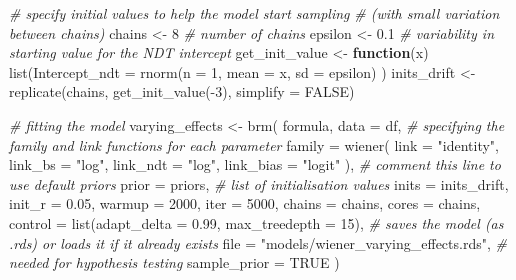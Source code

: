 \documentclass[
  11pt,
  english,
  ,doc,floatsintext]{apa6}
\newenvironment{Shaded}{}{}
\newcommand{\AttributeTok}[1]{\textcolor[rgb]{0.49,0.56,0.16}{#1}}
\newcommand{\CommentTok}[1]{\textcolor[rgb]{0.38,0.63,0.69}{\textit{#1}}}
\newcommand{\ConstantTok}[1]{\textcolor[rgb]{0.53,0.00,0.00}{#1}}
\newcommand{\ControlFlowTok}[1]{\textcolor[rgb]{0.00,0.44,0.13}{\textbf{#1}}}
\newcommand{\DecValTok}[1]{\textcolor[rgb]{0.25,0.63,0.44}{#1}}
\newcommand{\FloatTok}[1]{\textcolor[rgb]{0.25,0.63,0.44}{#1}}
\newcommand{\FunctionTok}[1]{\textcolor[rgb]{0.02,0.16,0.49}{#1}}
\newcommand{\NormalTok}[1]{#1}
\newcommand{\OtherTok}[1]{\textcolor[rgb]{0.00,0.44,0.13}{#1}}
\newcommand{\SpecialCharTok}[1]{\textcolor[rgb]{0.25,0.44,0.63}{#1}}
\newcommand{\StringTok}[1]{\textcolor[rgb]{0.25,0.44,0.63}{#1}}
\begin{document}
\begin{Shaded}
\begin{Highlighting}[]
\CommentTok{\# specify initial values to help the model start sampling}
\CommentTok{\# (with small variation between chains)}
\NormalTok{chains }\OtherTok{\textless{}{-}} \DecValTok{8} \CommentTok{\# number of chains}
\NormalTok{epsilon }\OtherTok{\textless{}{-}} \FloatTok{0.1} \CommentTok{\# variability in starting value for the NDT intercept}
\NormalTok{get\_init\_value }\OtherTok{\textless{}{-}} \ControlFlowTok{function}\NormalTok{(x) }\FunctionTok{list}\NormalTok{(}\AttributeTok{Intercept\_ndt =} \FunctionTok{rnorm}\NormalTok{(}\AttributeTok{n =} \DecValTok{1}\NormalTok{, }\AttributeTok{mean =}\NormalTok{ x, }\AttributeTok{sd =}\NormalTok{ epsilon) )}
\NormalTok{inits\_drift }\OtherTok{\textless{}{-}} \FunctionTok{replicate}\NormalTok{(chains, }\FunctionTok{get\_init\_value}\NormalTok{(}\SpecialCharTok{{-}}\DecValTok{3}\NormalTok{), }\AttributeTok{simplify =} \ConstantTok{FALSE}\NormalTok{)}

\CommentTok{\# fitting the model}
\NormalTok{varying\_effects }\OtherTok{\textless{}{-}} \FunctionTok{brm}\NormalTok{(}
\NormalTok{  formula, }
  \AttributeTok{data =}\NormalTok{ df,}
  \CommentTok{\# specifying the family and link functions for each parameter}
  \AttributeTok{family =} \FunctionTok{wiener}\NormalTok{(}
    \AttributeTok{link =} \StringTok{"identity"}\NormalTok{, }\AttributeTok{link\_bs =} \StringTok{"log"}\NormalTok{,}
    \AttributeTok{link\_ndt =} \StringTok{"log"}\NormalTok{, }\AttributeTok{link\_bias =} \StringTok{"logit"}
\NormalTok{    ),}
  \CommentTok{\# comment this line to use default priors}
  \AttributeTok{prior =}\NormalTok{ priors,}
  \CommentTok{\# list of initialisation values}
  \AttributeTok{inits =}\NormalTok{ inits\_drift,}
  \AttributeTok{init\_r =} \FloatTok{0.05}\NormalTok{,}
  \AttributeTok{warmup =} \DecValTok{2000}\NormalTok{, }\AttributeTok{iter =} \DecValTok{5000}\NormalTok{,}
  \AttributeTok{chains =}\NormalTok{ chains, }\AttributeTok{cores =}\NormalTok{ chains,}
  \AttributeTok{control =} \FunctionTok{list}\NormalTok{(}\AttributeTok{adapt\_delta =} \FloatTok{0.99}\NormalTok{, }\AttributeTok{max\_treedepth =} \DecValTok{15}\NormalTok{),}
  \CommentTok{\# saves the model (as .rds) or loads it if it already exists}
  \AttributeTok{file =} \StringTok{"models/wiener\_varying\_effects.rds"}\NormalTok{,}
  \CommentTok{\# needed for hypothesis testing}
  \AttributeTok{sample\_prior =} \ConstantTok{TRUE}
\NormalTok{  )}
\end{Highlighting}
\end{Shaded}
\end{document}
